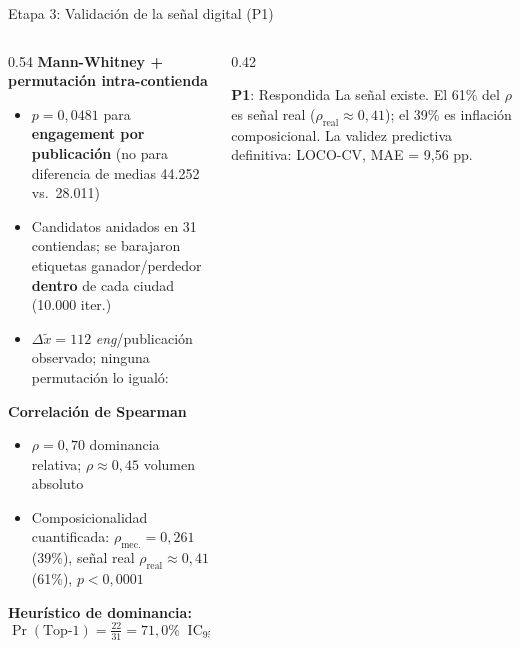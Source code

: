 \begin{frame}{Etapa 3: Validación de la señal digital (P1)}
  \begin{columns}[T]
    \begin{column}{0.54\textwidth}
      \textbf{Mann-Whitney + permutación intra-contienda} \corr{[Corr.\ 1.16/2.2]}
      \begin{itemize}\scriptsize
        \item $p = 0{,}0481$ para \textbf{engagement por publicación}
              (no para diferencia de medias 44.252 vs.\ 28.011)
        \item Candidatos anidados en 31 contiendas; se barajaron etiquetas
              ganador/perdedor \textbf{dentro} de cada ciudad (10.000 iter.)
        \item $\Delta\tilde{x} = 112$ \textit{eng}/publicación observado;
              ninguna permutación lo igualó: 
      \end{itemize}
      \vspace{0.15em}
      \textbf{Correlación de Spearman} \corr{[Corr.\ 2.2]}
      \begin{itemize}\scriptsize
        \item $\rho = 0{,}70$ dominancia relativa; $\rho \approx 0{,}45$ volumen absoluto
        \item Composicionalidad cuantificada: $\rho_{\text{mec.}} = 0{,}261$ (39\%),
              señal real $\rho_{\text{real}} \approx 0{,}41$ (61\%), $p < 0{,}0001$
      \end{itemize}
      \vspace{0.15em}
      \textbf{Heurístico de dominancia:}
      \[\textstyle
        \Pr(\text{Top-1}) = \tfrac{22}{31} = 71{,}0\%
        \;\;\text{IC}_{95\%}\text{Wilson:}\;[53{,}4\%,\;83{,}9\%]
      \]
    \end{column}
    \begin{column}{0.42\textwidth}
      \begin{exampleblock}{\textbf{P1}: Respondida}
        \small La señal existe. El 61\% del $\rho$ es
        señal real ($\rho_{\text{real}} \approx 0{,}41$);
        el 39\% es inflación composicional. La validez
        predictiva definitiva: LOCO-CV, MAE = 9{,}56 pp.
      \end{exampleblock}
    \end{column}
  \end{columns}
\end{frame}



